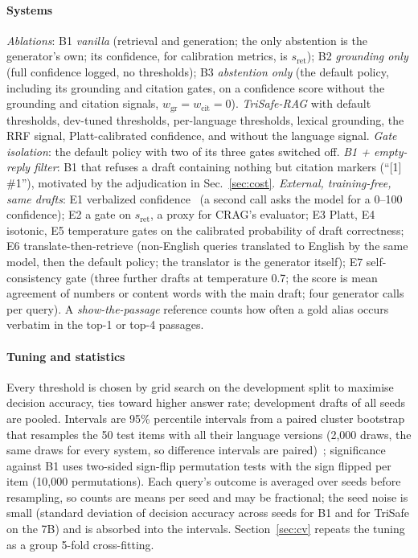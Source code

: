 \paragraph{Systems} \emph{Ablations}: B1 \emph{vanilla} (retrieval and generation; the only abstention is the generator's own; its confidence, for calibration metrics, is $s_{\mathrm{ret}}$); B2 \emph{grounding only} (full confidence logged, no thresholds); B3 \emph{abstention only} (the default policy, including its grounding and citation gates, on a confidence score without the grounding and citation signals, $w_{\mathrm{gr}}{=}w_{\mathrm{cit}}{=}0$). \emph{TriSafe-RAG} with default thresholds, dev-tuned thresholds, per-language thresholds, lexical grounding, the RRF signal, Platt-calibrated confidence, and without the language signal. \emph{Gate isolation}: the default policy with two of its three gates switched off. \emph{B1 + empty-reply filter}: B1 that refuses a draft containing nothing but citation markers (``[1] \#1''), motivated by the adjudication in Sec.~\ref{sec:cost}. \emph{External, training-free, same drafts}: E1 verbalized confidence~\cite{xiong2024verbalized} (a second call asks the model for a 0--100 confidence); E2 a gate on $s_{\mathrm{ret}}$, a proxy for CRAG's evaluator; E3 Platt, E4 isotonic, E5 temperature gates on the calibrated probability of draft correctness; E6 translate-then-retrieve (non-English queries translated to English by the same model, then the default policy; the translator is the generator itself); E7 self-consistency gate (three further drafts at temperature 0.7; the score is mean agreement of numbers or content words with the main draft; four generator calls per query). A \emph{show-the-passage} reference counts how often a gold alias occurs verbatim in the top-1 or top-4 passages.

\paragraph{Tuning and statistics} Every threshold is chosen by grid search on the development split to maximise decision accuracy, ties toward higher answer rate; development drafts of all seeds are pooled. Intervals are 95\% percentile intervals from a paired cluster bootstrap that resamples the 50 test items with all their language versions (2{,}000 draws, the same draws for every system, so difference intervals are paired)~\cite{koehn2004bootstrap}; significance against B1 uses two-sided sign-flip permutation tests with the sign flipped per item (10{,}000 permutations). Each query's outcome is averaged over seeds before resampling, so counts are means per seed and may be fractional; the seed noise is small (standard deviation of decision accuracy across seeds \LBoneDecSd{} for B1 and \LTunDecSd{} for TriSafe on the 7B) and is absorbed into the intervals. Section~\ref{sec:cv} repeats the tuning as a group 5-fold cross-fitting.

